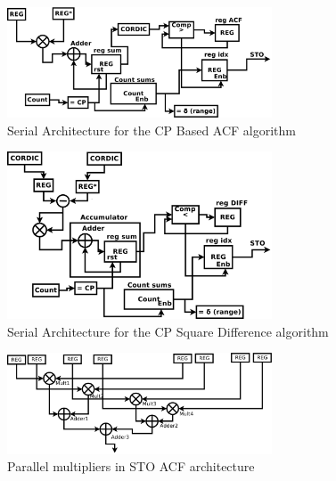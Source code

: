 
\begin{figure}[!hbt]
  \centering
    \includegraphics[width=0.7\textwidth]
      {./figures/sto_arq_acf_serial}
  \caption{Serial Architecture for the CP Based ACF algorithm}
  \label{fig:arq_sto_acf_serial}
\end{figure}


\begin{figure}[!hbt]
  \centering
    \includegraphics[width=0.7\textwidth]
      {./figures/sto_arq_diff_serial}
  \caption{Serial Architecture for the CP Square Difference algorithm }
  \label{fig:arq_sto_diff_serial}
\end{figure}

\begin{figure}[!hbt]
  \centering
    \includegraphics[width=0.7\textwidth]
      {./figures/semi_parallel}
  \caption{Parallel multipliers in STO ACF architecture}
  \label{fig:arq_sto_cp_parallel}
\end{figure}

